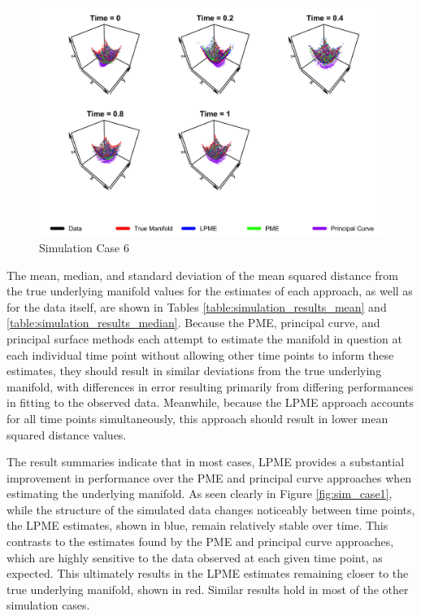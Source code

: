 \documentclass[11pt,reqno]{article}
\renewcommand{\textwidth}{180mm}
\theoremstyle{definition}
\begin{document}
\begin{figure}[h]
  \centering
  \includegraphics[width=\textwidth]{sim_case7}
  \caption{Simulation Case 6}
  \label{fig:sim_case6}
\end{figure}

The mean, median, and standard deviation of the mean squared distance from the true underlying manifold values for the estimates of each approach, as well as for the data itself, are shown in Tables \ref{table:simulation_results_mean} and \ref{table:simulation_results_median}. Because the PME, principal curve, and principal surface methods each attempt to estimate the manifold in question at each individual time point without allowing other time points to inform these estimates, they should result in similar deviations from the true underlying manifold, with differences in error resulting primarily from differing performances in fitting to the observed data. Meanwhile, because the LPME approach accounts for all time points simultaneously, this approach should result in lower mean squared distance values.

The result summaries indicate that in most cases, LPME provides a substantial improvement in performance over the PME and principal curve approaches when estimating the underlying manifold. As seen clearly in Figure \ref{fig:sim_case1}, while the structure of the simulated data changes noticeably between time points, the LPME estimates, shown in blue, remain relatively stable over time. This contrasts to the estimates found by the PME and principal curve approaches, which are highly sensitive to the data observed at each given time point, as expected. This ultimately results in the LPME estimates remaining closer to the true underlying manifold, shown in red. Similar results hold in most of the other simulation cases.
\end{document}
